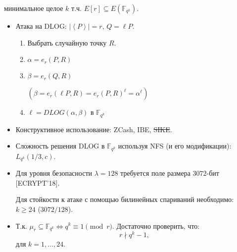 \documentclass{beamer}
\begin{document}
\begin{frame}
     минимальное целое $k$ т.ч. $E[r] \subseteq E(\mathbb{F}_{q^k})$.
    
    \begin{itemize}
        \item Атака на DLOG: $\mid\left<P\right>\mid = r$, $Q = \ell P$.
        \begin{enumerate}
            \item Выбрать случайную точку $R$.
            \item $\alpha = e_r(P, R)$
            \item $\beta  = e_r(Q, R)$ \hfill 
            \begin{scriptsize}
                $(\beta = e_r(\ell P, R) = e_r(P, R)^\ell = \alpha^\ell)$
            \end{scriptsize}
            \item $\ell = DLOG(\alpha, \beta)$ в $\mathbb{F}_{q^k}$
        \end{enumerate}    
        \item Конструктивное использование: ZCash, IBE, \st{SIKE}.
    \end{itemize}
\end{frame}

\begin{frame}
\begin{itemize}
    \item Сложность решения DLOG в $\mathbb{F}_{q^k}$ используя
NFS (и его модификации): $L_{q^k}(1/3, c)$.
    \item Для уровня безопасности $\lambda = 128$ требуется поле размера $3072$-бит [ECRYPT'18].
    
    \begin{center}
        \structure{$\Downarrow$}
    \end{center}

    Для стойкости к атаке с помощью билинейных спариваний необходимо: $k \geq 24$ ($3072/128$).
    \item Т.к. $\mu_r \subseteq \mathbb{F}_{q^k} \iff q^k \equiv 1 \pmod{r}$. Достаточно проверить, что:
    \[
    r \nmid q^k - 1, 
    \]
    для $k = 1, \ldots, 24$.
\end{itemize}
\end{frame}
\end{document}
